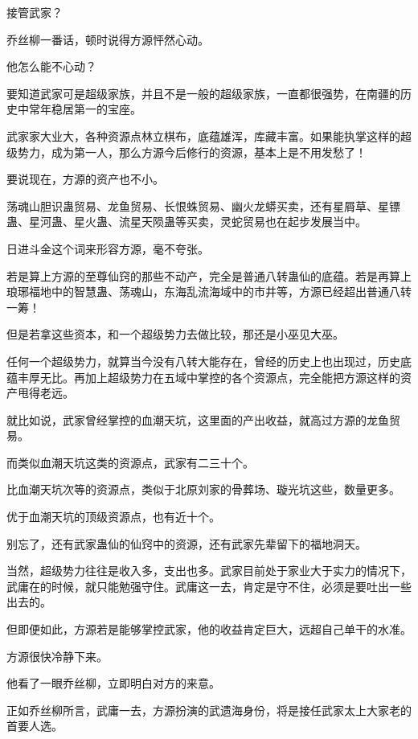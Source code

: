 
\begin{this_body}

接管武家？

乔丝柳一番话，顿时说得方源怦然心动。

他怎么能不心动？

要知道武家可是超级家族，并且不是一般的超级家族，一直都很强势，在南疆的历史中常年稳居第一的宝座。

武家家大业大，各种资源点林立棋布，底蕴雄浑，库藏丰富。如果能执掌这样的超级势力，成为第一人，那么方源今后修行的资源，基本上是不用发愁了！

要说现在，方源的资产也不小。

荡魂山胆识蛊贸易、龙鱼贸易、长恨蛛贸易、幽火龙蟒买卖，还有星屑草、星镖蛊、星河蛊、星火蛊、流星天陨蛊等买卖，灵蛇贸易也在起步发展当中。

日进斗金这个词来形容方源，毫不夸张。

若是算上方源的至尊仙窍的那些不动产，完全是普通八转蛊仙的底蕴。若是再算上琅琊福地中的智慧蛊、荡魂山，东海乱流海域中的市井等，方源已经超出普通八转一筹！

但是若拿这些资本，和一个超级势力去做比较，那还是小巫见大巫。

任何一个超级势力，就算当今没有八转大能存在，曾经的历史上也出现过，历史底蕴丰厚无比。再加上超级势力在五域中掌控的各个资源点，完全能把方源这样的资产甩得老远。

就比如说，武家曾经掌控的血潮天坑，这里面的产出收益，就高过方源的龙鱼贸易。

而类似血潮天坑这类的资源点，武家有二三十个。

比血潮天坑次等的资源点，类似于北原刘家的骨葬场、璇光坑这些，数量更多。

优于血潮天坑的顶级资源点，也有近十个。

别忘了，还有武家蛊仙的仙窍中的资源，还有武家先辈留下的福地洞天。

当然，超级势力往往是收入多，支出也多。武家目前处于家业大于实力的情况下，武庸在的时候，就只能勉强守住。武庸这一去，肯定是守不住，必须是要吐出一些出去的。

但即便如此，方源若是能够掌控武家，他的收益肯定巨大，远超自己单干的水准。

方源很快冷静下来。

他看了一眼乔丝柳，立即明白对方的来意。

正如乔丝柳所言，武庸一去，方源扮演的武遗海身份，将是接任武家太上大家老的首要人选。


\end{this_body}
